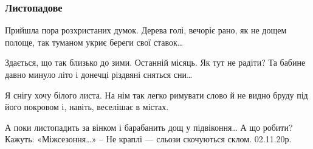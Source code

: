  
 
 

\subsubsection{Листопадове}
\label{sec:poetry.rus.mykola_sobol.lystopadove}

Прийшла пора розхристаних думок.
Дерева голі, вечоріє рано,
як не дощем полоще, так туманом
укриє береги свої ставок…

Здається, що так близько до зими.
Останній місяць. Як тут не радіти?
Та бабине давно минуло літо
і донечці різдвяні сняться сни…

Я снігу хочу білого листа.
На нім так легко римувати слово
й не видно бруду під його покровом
і, навіть, веселішає в містах.

А поки листопадить за вінком
і барабанить дощ у підвіконня…
А що робити? Кажуть: «Міжсезоння…» –
Не краплі --- сльози скочуються склом.
02.11.20р.
